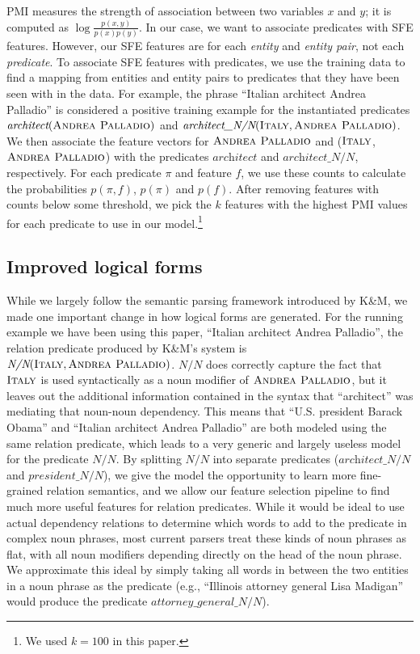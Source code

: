 \documentclass[11pt]{article}
\newcommand{\lexicalpredicate}[1]{\ensuremath{\textit{#1}}}
\newcommand{\entity}[1]{\ensuremath{\textsc{#1}}}
\begin{document}
PMI measures the strength of association between two variables $x$ and $y$; it
is computed as $\log\frac{p(x,y)}{p(x)p(y)}$.  In our case, we want to
associate predicates with SFE features.  However, our SFE features are for each
\emph{entity} and \emph{entity pair}, not each \emph{predicate}.  To associate
SFE features with predicates, we use the training data to find a mapping from
entities and entity pairs to predicates that they have been seen with in the
data.  For example, the phrase ``Italian architect Andrea Palladio'' is
considered a positive training example for the instantiated predicates
$\lexicalpredicate{architect}(\entity{Andrea Palladio})$ and
$\lexicalpredicate{architect\_N/N}(\entity{Italy}, \entity{Andrea Palladio})$.  We
then associate the feature vectors for \entity{Andrea Palladio} and
(\entity{Italy}, \entity{Andrea Palladio}) with the predicates
\lexicalpredicate{architect} and \lexicalpredicate{architect\_N/N}, respectively.  For each
predicate $\pi$ and feature $f$, we use these counts to calculate the
probabilities $p(\pi, f)$, $p(\pi)$ and $p(f)$.  After removing features with
counts below some threshold, we pick the $k$ features with the highest PMI
values for each predicate to use in our model.\footnote{We used $k=100$ in this
paper.}

\subsection{Improved logical forms}
\label{sec:better-lfs}

While we largely follow the semantic parsing framework introduced by K\&M, we
made one important change in how logical forms are generated.  For the running
example we have been using this paper, ``Italian architect Andrea Palladio'',
the relation predicate produced by K\&M's system is
$\lexicalpredicate{N/N}(\entity{Italy}, \entity{Andrea Palladio})$.
\lexicalpredicate{N/N}
does correctly capture the fact that \entity{Italy} is used syntactically as a
noun modifier of \entity{Andrea Palladio}, but it leaves out the additional
information contained in the syntax that ``architect'' was mediating that
noun-noun dependency.  This means that ``U.S. president Barack Obama'' and
``Italian architect Andrea Palladio'' are both modeled using the same relation
predicate, which leads to a very generic and largely useless model for the
predicate \lexicalpredicate{N/N}.  By splitting \lexicalpredicate{N/N} into separate
predicates (\lexicalpredicate{architect\_N/N} and \lexicalpredicate{president\_N/N}), we give
the model the opportunity to learn more fine-grained relation semantics, and we
allow our feature selection pipeline to find much more useful features for
relation predicates.  While it would be ideal to use actual dependency
relations to determine which words to add to the predicate in complex noun
phrases, most current parsers treat these kinds of noun phrases as flat, with
all noun modifiers depending directly on the head of the noun phrase.  We
approximate this ideal by simply taking all words in between the two entities
in a noun phrase as the predicate (e.g., ``Illinois attorney general Lisa
Madigan'' would produce the predicate \lexicalpredicate{attorney\_general\_N/N}).
\end{document}
